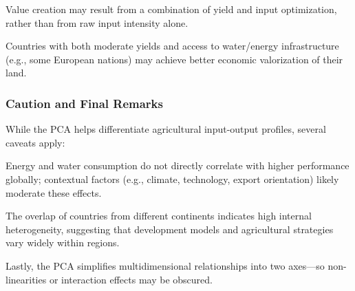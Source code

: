 \documentclass[
]{article}
\begin{document}
Value creation may result from a combination of yield and input
optimization, rather than from raw input intensity alone.

Countries with both moderate yields and access to water/energy
infrastructure (e.g., some European nations) may achieve better economic
valorization of their land.

\hypertarget{caution-and-final-remarks}{%
\subsubsection{Caution and Final
Remarks}\label{caution-and-final-remarks}}

While the PCA helps differentiate agricultural input-output profiles,
several caveats apply:

Energy and water consumption do not directly correlate with higher
performance globally; contextual factors (e.g., climate, technology,
export orientation) likely moderate these effects.

The overlap of countries from different continents indicates high
internal heterogeneity, suggesting that development models and
agricultural strategies vary widely within regions.

Lastly, the PCA simplifies multidimensional relationships into two
axes---so non-linearities or interaction effects may be obscured.
\end{document}
